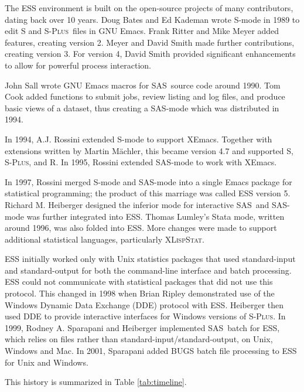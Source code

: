 \documentclass{article}
\newcommand*{\SAS}{\textsc{SAS}}
\newcommand*{\Splus}{\textsc{S-Plus}}
\newcommand*{\XLispStat}{\textsc{XLispStat}}
\begin{document}
The ESS environment is built on the open-source projects of
many contributors, dating back over 10 years.
Doug Bates and Ed Kademan wrote S-mode in 1989 to edit S and \Splus\ 
files in GNU Emacs.  Frank Ritter and Mike Meyer added features,
creating version 2.  Meyer and David Smith made further contributions,
creating version 3.  For version 4, David Smith provided significant
enhancements to allow for powerful process interaction.

John Sall wrote GNU Emacs macros for \SAS\ source code around 1990.
Tom Cook added functions to submit jobs, review listing and log files,
and produce basic views of a dataset, thus creating a SAS-mode which was
distributed in 1994.

In 1994, A.J. Rossini extended S-mode to support XEmacs.  Together
with extensions written by Martin M{\"a}chler, this became version
4.7 and supported S, \Splus, and R.
In 1995, Rossini extended SAS-mode to work with XEmacs. 

In 1997, Rossini merged S-mode and SAS-mode into a single Emacs
package for statistical programming; the product of this marriage was
called ESS version 5.  Richard M. Heiberger designed the inferior mode
for interactive \SAS\ and SAS-mode was further integrated into ESS.
Thomas Lumley's Stata mode, written around 1996, was also folded into
ESS.  More changes were made to support additional statistical
languages, particularly \XLispStat.

ESS initially worked only with Unix statistics packages that used
standard-input and standard-output for both the command-line interface
and batch processing.  ESS could not communicate with statistical
packages that did not use this protocol.  This changed in 1998 when
Brian Ripley demonstrated use of the Windows Dynamic Data Exchange
(DDE) protocol with ESS.  Heiberger then used DDE to provide
interactive interfaces for Windows versions of \Splus.  In 1999,
Rodney A. Sparapani and Heiberger implemented \SAS\ batch for ESS, which
relies on files rather than standard-input/standard-output, on Unix,
Windows and Mac.  In 2001, Sparapani added BUGS batch file processing
to ESS for Unix and Windows.

This history is summarized in Table \ref{tab:timeline}.
\end{document}

